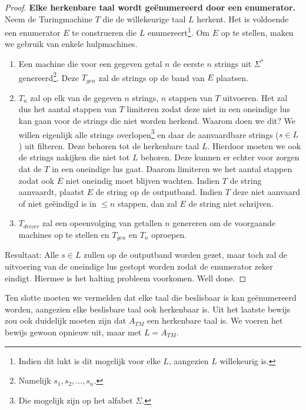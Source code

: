 \begin{proof}
	\textbf{Elke herkenbare taal wordt ge\"enumereerd door een enumerator.} Neem de Turingmachine $T$ die de willekeurige taal $L$ herkent. Het is voldoende een enumerator $E$ te construeren die $L$ enumereert\footnote{Indien dit lukt is dit mogelijk voor elke $L$, aangezien $L$ willekeurig is.}. Om $E$ op te stellen, maken we gebruik van enkele hulpmachines.\\
	\begin{enumerate}
		\item Een machine die voor een gegeven getal $n$ de eerste $n$ strings uit $\Sigma^*$ genereerd\footnote{Namelijk $s_1,s_2, \dots ,s_n$.}. Deze $T_{gen}$ zal de strings op de band van $E$ plaatsen.
		\item $T_n$  zal op elk van de gegeven $n$ strings, $n$ stappen van $T$ uitvoeren. Het zal dus het aantal stappen van $T$ limiteren zodat deze niet in een oneindige lus kan gaan voor de strings die niet worden herkend. Waarom doen we dit? We willen eigenlijk alle strings overlopen\footnote{Die mogelijk zijn op het alfabet $\Sigma$.} en daar de aanvaardbare strings ($s \in L$) uit filteren. Deze behoren tot de herkenbare taal $L$. Hierdoor moeten we ook de strings nakijken die niet tot $L$ behoren. Deze kunnen er echter voor zorgen dat de $T$ in een oneindige lus gaat. Daarom limiteren we het aantal stappen zodat ook $E$ niet oneindig moet blijven wachten. Indien $T$ de string aanvaardt, plaatst $E$ de string op de outputband. Indien $T$ deze niet aanvaard of niet ge\"eindigd is in $\leq n$ stappen, dan zal $E$ de string niet schrijven.
		\item $T_{driver}$ zal een opeenvolging van getallen $n$ genereren om de voorgaande machines op te stellen en $T_{gen}$ en $T_n$ oproepen.\\
	\end{enumerate}
	Resultaat: Alle $s \in L$ zullen op de outputband worden gezet, maar toch zal de uitvoering van de oneindige lus gestopt worden zodat de enumerator zeker eindigt. Hiermee is het halting probleem voorkomen. Well done.
\end{proof}

Ten slotte moeten we vermelden dat elke taal die beslisbaar is kan ge\"enumereerd worden, aangezien elke beslisbare taal ook herkenbaar is. Uit het laatste bewijs zou ook duidelijk moeten zijn dat $A_{TM}$ een herkenbare taal is. We voeren het bewijs gewoon opnieuw uit, maar met $L = A_{TM}$.
